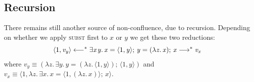 \documentclass[acmsmall,review,dvipsnames]{acmart}
\newcommand{\Varid}[1]{\mathit{#1}}
\newcommand{\rulename}[1]{\textsc{\small #1}}
\newcommand{\movesto}{\longrightarrow}
\newcommand{\movesfrom}{\longleftarrow}
\begin{document}
\label{sec:conf-move-eqn}

\subsection{Recursion}%
\label{sec:confluence-and-recursion}

There remains still another source of non-confluence, due to recursion. Depending on whether we apply \rulename{subst} first to \ensuremath{\Varid{x}} or \ensuremath{\Varid{y}} we get these two reductions:
\[ \ensuremath{\langle{}\mathrm{1},\Varid{v}_{\Varid{y}}\rangle\movesfrom^{\ast}\exists\Varid{x}\hspace{0.3mm}\Varid{y}.\,\Varid{x}\mathrel{=}\langle{}\mathrm{1},\Varid{y}\rangle;\,\Varid{y}\mathrel{=}(\lambda\Varid{z}.\,\Varid{x});\,\Varid{x}\movesto^{\ast}\Varid{v}_{\Varid{x}}}\]
where $\ensuremath{\Varid{v}_{\Varid{y}}} \equiv \ensuremath{(\lambda\Varid{z}.\,\exists\Varid{y}.\,\Varid{y}\mathrel{=}(\lambda\Varid{z}.\,\langle{}\mathrm{1},\Varid{y}\rangle);\,\langle{}\mathrm{1},\Varid{y}\rangle)}$ and $\ensuremath{\Varid{v}_{\Varid{x}}} \equiv \ensuremath{\langle{}\mathrm{1},\lambda\Varid{z}.\,\exists\Varid{x}.\,\Varid{x}\mathrel{=}\langle{}\mathrm{1},(\lambda\Varid{z}.\,\Varid{x})\rangle;\,\Varid{x}\rangle}$.
%
\end{document}
